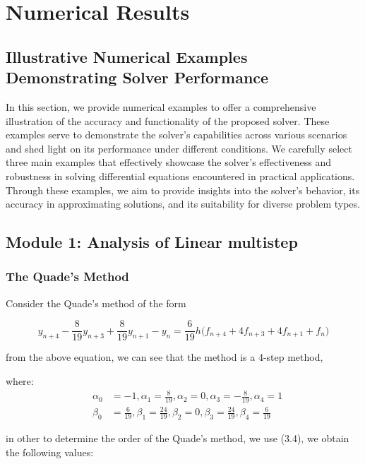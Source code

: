 \chapter{Numerical Results}
\section*{Illustrative Numerical Examples Demonstrating Solver Performance}

In this section, we provide numerical examples to offer a comprehensive illustration of the accuracy and functionality of the proposed solver. These examples serve to demonstrate the solver's capabilities across various scenarios and shed light on its performance under different conditions. We carefully select three main examples that effectively showcase the solver's effectiveness and robustness in solving differential equations encountered in practical applications. Through these examples, we aim to provide insights into the solver's behavior, its accuracy in approximating solutions, and its suitability for diverse problem types.



\section{Module 1: Analysis of Linear multistep}
\subsection{The Quade's Method}
Consider the Quade's method of the form \cite{lambert1977}

\begin{equation}
    y_{n+4} - \frac{8}{19}y_{n+3} + \frac{8}{19}y_{n+1} - y_{n} =  \frac{6}{19}h\bigl(f_{n+4}+4f_{n+3}+4f_{n+1}+f_{n}\bigr)
\end{equation}


from the above equation, we can see that the method is a 4-step method,


where:
\[
\begin{aligned}&\alpha_0 &= -1, \alpha_1 = \frac{8}{19}, \alpha_2 = 0, \alpha_3 = -\frac{8}{19}, \alpha_4 = 1 \\
&\beta_0 &= \frac{6}{19}, \beta_1 = \frac{24}{19}, \beta_2 = 0, \beta_3 = \frac{24}{19}, \beta_4 = \frac{6}{19} 
\end{aligned}
\]

in other to determine the order of the Quade's method, we use (3.4), we obtain the following values:


